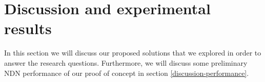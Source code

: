 \section{Discussion and experimental results}\label{disc}







In this section we will discuss our proposed solutions that we explored in order to answer the research questions. Furthermore, we will discuss some preliminary NDN performance of our proof of concept in section \ref{discussion-performance}.


